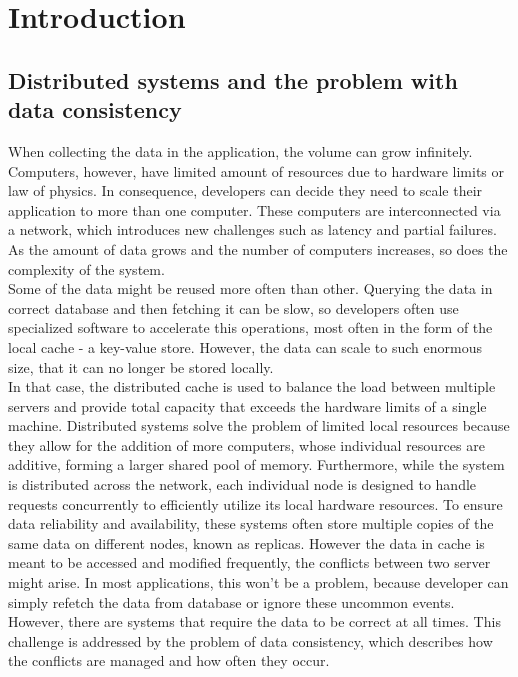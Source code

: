\documentclass[shortabstract]{iithesis}
\author         {Dominik Szczepaniak}
\begin{document}

\chapter{Introduction}

\section{Distributed systems and the problem with data consistency}
When collecting the data in the application, the volume can grow infinitely. Computers, however, have limited amount of resources due to hardware limits or law of physics. In consequence, developers can decide they need to scale their application to more than one computer. These computers are interconnected via a network, which introduces new challenges such as latency and partial failures. As the amount of data grows and the number of computers increases, so does the complexity of the system. \\
Some of the data might be reused more often than other. Querying the data in correct database and then fetching it can be slow, so developers often use specialized software to accelerate this operations, most often in the form of the local cache - a key-value store. However, the data can scale to such enormous size, that it can no longer be stored locally.\\
In that case, the distributed cache is used to balance the load between multiple servers and provide total capacity that exceeds the hardware limits of a single machine. Distributed systems solve the problem of limited local resources because they allow for the addition of more computers, whose individual resources are additive, forming a larger shared pool of memory. Furthermore, while the system is distributed across the network, each individual node is designed to handle requests concurrently to efficiently utilize its local hardware resources. To ensure data reliability and availability, these systems often store multiple copies of the same data on different nodes, known as replicas. However the data in cache is meant to be accessed and modified frequently, the conflicts between two server might arise. In most applications, this won't be a problem, because developer can simply refetch the data from database or ignore these uncommon events. However, there are systems that require the data to be correct at all times. This challenge is addressed by the problem of data consistency, which describes how the conflicts are managed and how often they occur.
\end{document}
